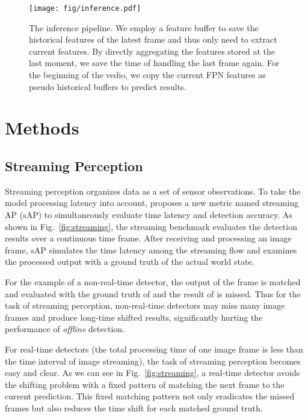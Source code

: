 \documentclass[10pt,twocolumn,letterpaper]{article}
\begin{document}
\begin{figure}[b]
\begin{center}
\texttt{[image: fig/inference.pdf]}
\caption{The inference pipeline. We employ a feature buffer to save the historical features of the latest frame and thus only need to extract current features. By directly aggregating the features stored at the last moment, we save the time of handling the last frame again. For the beginning of the vedio, we copy the current FPN features as pseudo historical buffers to predict results.}
\label{fig:inference}
\end{center}
\end{figure}


\section{Methods}

\subsection{Streaming Perception}
Streaming perception organizes data as a set of sensor observations. To take the model processing latency into account, \cite{streamer} proposes a new metric named streaming AP (sAP) to simultaneously evaluate time latency and detection accuracy. As shown in Fig.~\ref{fig:streaming}, the streaming benchmark evaluates the detection results over a continuous time frame. After receiving and processing an image frame, sAP simulates the time latency among the streaming flow and examines the processed output with a ground truth of the actual world state.

For the example of a non-real-time detector, the output  of the frame  is matched and evaluated with the ground truth of  and the result of  is missed. Thus for the task of streaming perception, non-real-time detectors may miss many image frames and produce long-time shifted results, significantly hurting the performance of \emph{offline} detection.   

For real-time detectors (the total processing time of one image frame is less than the time interval of image streaming), the task of streaming perception becomes easy and clear. 
As we can see in Fig.~\ref{fig:streaming}, a real-time detector avoids the shifting problem with a fixed pattern of matching the next frame to the current prediction.
This fixed matching pattern not only eradicates the missed frames but also reduces the time shift for each matched ground truth. 
\end{document}
